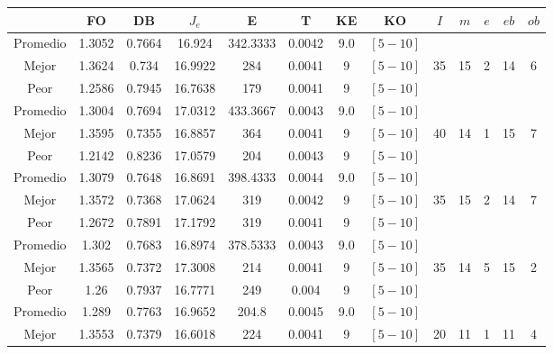 \begin{table}[h!]
    \footnotesize
    \begin{center}
        \begin{tabular}{|c|c|c|c|c|c|c|c|c|c|c|c|c|}
        \hline
            & {\bf FO} & {\bf DB} & $J_e$ & {\bf E} & {\bf T} & {\bf KE} & {\bf KO} & $I$ & $m$ & $e$ & $eb$ & $ob$ \\
        \hline
        \hline
            Promedio  & 1.3052 & 0.7664 & 16.924 & 342.3333 & 0.0042 & 9.0 & $[5-10]$ &  &  &  &  & \\
            \cline{1-8}
            Mejor & 1.3624 & 0.734  & 16.9922 & 284 & 0.0041 & 9 & $[5-10]$ & 35 & 15 & 2 & 14 & 6\\
            \cline{1-8}
            Peor & 1.2586 & 0.7945  & 16.7638 & 179 & 0.0041 & 9 & $[5-10]$ &  &  &  &  & \\
        \hline
        \hline
            Promedio  & 1.3004 & 0.7694 & 17.0312 & 433.3667 & 0.0043 & 9.0 & $[5-10]$ &  &  &  &  & \\
            \cline{1-8}
            Mejor & 1.3595 & 0.7355  & 16.8857 & 364 & 0.0041 & 9 & $[5-10]$ & 40 & 14 & 1 & 15 & 7\\
            \cline{1-8}
            Peor & 1.2142 & 0.8236  & 17.0579 & 204 & 0.0043 & 9 & $[5-10]$ &  &  &  &  & \\
        \hline
        \hline
            Promedio  & 1.3079 & 0.7648 & 16.8691 & 398.4333 & 0.0044 & 9.0 & $[5-10]$ &  &  &  &  & \\
            \cline{1-8}
            Mejor & 1.3572 & 0.7368  & 17.0624 & 319 & 0.0042 & 9 & $[5-10]$ & 35 & 15 & 2 & 14 & 7\\
            \cline{1-8}
            Peor & 1.2672 & 0.7891  & 17.1792 & 319 & 0.0041 & 9 & $[5-10]$ &  &  &  &  & \\
        \hline
        \hline
            Promedio  & 1.302 & 0.7683 & 16.8974 & 378.5333 & 0.0043 & 9.0 & $[5-10]$ &  &  &  &  & \\
            \cline{1-8}
            Mejor & 1.3565 & 0.7372  & 17.3008 & 214 & 0.0041 & 9 & $[5-10]$ & 35 & 14 & 5 & 15 & 2\\
            \cline{1-8}
            Peor & 1.26 & 0.7937  & 16.7771 & 249 & 0.004 & 9 & $[5-10]$ &  &  &  &  & \\
        \hline
        \hline
            Promedio  & 1.289 & 0.7763 & 16.9652 & 204.8 & 0.0045 & 9.0 & $[5-10]$ &  &  &  &  & \\
            \cline{1-8}
            Mejor & 1.3553 & 0.7379  & 16.6018 & 224 & 0.0041 & 9 & $[5-10]$ & 20 & 11 & 1 & 11 & 4\\

\end{tabular}
\end{center}
\end{table}
